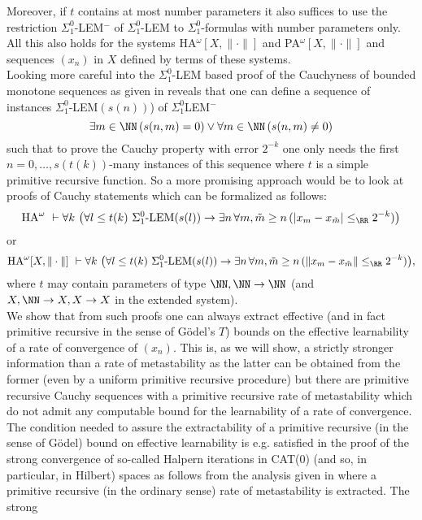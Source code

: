 Moreover, if $t$ contains at most number parameters it also suffices to 
use the restriction $\Sigma^0_1$-LEM$^-$ of $\Sigma^0_1$-LEM to 
$\Sigma^0_1$-formulas with number parameters only. All this also holds for 
the systems HA$^{\omega}[X,\|\cdot\|]$ and PA$^{\omega}[X,\|\cdot\|]$ 
and sequences $(x_n)$ in $X$ defined by terms of these systems.\\[2mm] 
Looking more careful into the $\Sigma^0_1$-LEM based proof of the 
Cauchyness of bounded monotone sequences as given in \cite{Toftdal} reveals 
that one can define a sequence of instances $\Sigma^0_1$-LEM$(s(n))$) 
of $\Sigma^0_1$LEM$^-$ 
\[ \exists m\in\NN \,(s(n,m)=0)\vee \forall m\in\NN\,(s(n,m)\not= 0) \] 
such that to prove the Cauchy property with error $2^{-k}$ one only needs 
the first $n=0,\ldots,s(t(k))$-many instances of this sequence where $t$ is 
a simple primitive recursive function. So a more promising approach would be
to look at proofs of Cauchy statements which can be formalized as follows:
\[ \mbox{HA}^{\omega}\ \vdash \forall k \  \big( \forall l\le t(k) \ 
\Sigma^0_1\mbox{-LEM}(s(l))\to \exists n\,\forall m,\tilde{m}\ge n\,
(|x_m-x_{\tilde{m}}|\le_{\RR} 2^{-k})\big) \] 
or 
\[ \mbox{HA}^{\omega}[X,\|\cdot\|] \ \vdash \forall k \  \big( \forall l\le 
t(k) \ 
\Sigma^0_1\mbox{-LEM}(s(l))\to \exists n\,\forall m,\tilde{m}\ge n\,
(\|x_m-x_{\tilde{m}}\|\le_{\RR} 2^{-k})\big), \]
where $t$ may contain parameters of type $\NN, \NN\to\NN$ (and $X,\NN\to X, 
X\to X$ in the extended system). \\[2mm] 
We show that from such proofs one can always extract effective (and in 
fact primitive recursive in the sense of G\"odel's $T$) bounds on the 
effective learnability of a rate of convergence of $(x_n).$ 
This is, as we will show, a strictly stronger information than a 
rate of metastability as 
the latter can be obtained from the former (even by a uniform primitive 
recursive procedure) but there are primitive recursive 
Cauchy sequences with a primitive recursive rate of metastability which 
do not admit any computable bound for the 
learnability of a rate of convergence. \\[2mm]
The condition needed to assure the extractability of a primitive recursive 
(in the sense of G\"odel) bound on effective learnability is e.g. satisfied in 
the proof of the strong convergence of so-called Halpern iterations 
in CAT(0) (and so, in particular, in Hilbert) spaces as follows from the 
analysis given in \cite{Kohlenbach/Leustean6} where a primitive recursive 
(in the ordinary sense) rate of metastability is extracted. The strong 
